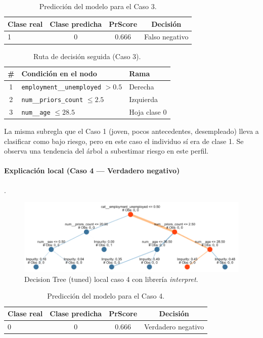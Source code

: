 \begin{table}[h!]
\centering
\caption{Predicción del modelo para el Caso 3.}
\label{tab:local-pred-caso3}
\small
\begin{tabular}{@{}lccc@{}}
\toprule
\textbf{Clase real} & \textbf{Clase predicha} & \textbf{PrScore} & \textbf{Decisión} \\
\midrule
1 & 0 & 0.666 & Falso negativo \\
\bottomrule
\end{tabular}
\end{table}

\begin{table}[h!]
\centering
\caption{Ruta de decisión seguida (Caso 3).}
\label{tab:local-path-caso3}
\small
\begin{tabular}{@{}cll@{}}
\toprule
\# & \textbf{Condición en el nodo} & \textbf{Rama} \\
\midrule
1 & \texttt{employment\_\_unemployed} \(> 0.5\) & Derecha \\
2 & \texttt{num\_\_priors\_count} \(\le 2.5\)   & Izquierda \\
3 & \texttt{num\_\_age} \(\le 28.5\)            & Hoja clase 0 \\
\bottomrule
\end{tabular}
\end{table}

La misma subregla que el Caso 1 (joven, pocos antecedentes, desempleado) lleva a clasificar como bajo riesgo, pero en este caso el individuo sí era de clase 1. Se observa una tendencia del árbol a subestimar riesgo en este perfil.

\paragraph{Explicación local (Caso 4 — Verdadero negativo)}.
\begin{figure}[H]
  \centering
  \includegraphics[width=0.92\linewidth]{figures/decision_tree_tunned_depth_local4.png}
  \caption{Decision Tree (tuned) local caso 4 con librería \textit{interpret}.}
  \label{fig:tree-tuned_local4}
\end{figure}
\begin{table}[H]
\centering
\caption{Predicción del modelo para el Caso 4.}
\label{tab:local-pred-caso4}
\small
\begin{tabular}{@{}lccc@{}}
\toprule
\textbf{Clase real} & \textbf{Clase predicha} & \textbf{PrScore} & \textbf{Decisión} \\
\midrule
0 & 0 & 0.666 & Verdadero negativo \\
\bottomrule
\end{tabular}
\end{table}


